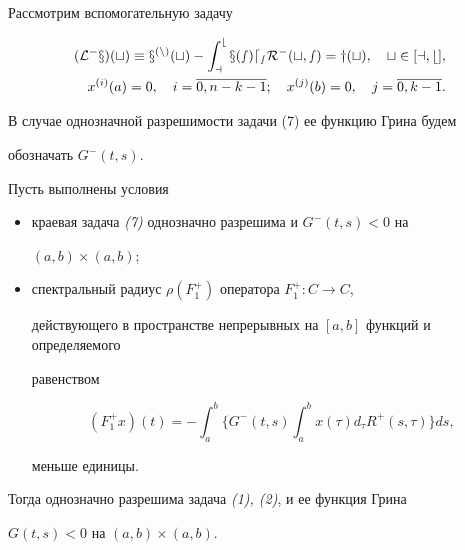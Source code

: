 Рассмотрим вспомогательную задачу 


\begin{equation} 


\begin{split} 


(\cal L^-x)(t)\equiv x^{(n)}(t)-\int^b_a x(s)d_sR^-(t,s)=y(t), 


\quad t\in[a,b],\\ 


x^{(i)}(a)=0,\quad i=\overline{0,n-k-1};\quad 


x^{(j)}(b)=0,\quad j=\overline{0,k-1}. 


\end{split} 


\end{equation} 


В случае однозначной разрешимости задачи (7) ее функцию Грина будем 


обозначать $G^-(t,s)$. 


 


\begin{lem} Пусть выполнены условия 


\begin{itemize} 


\item[1)] краевая задача {\em (7)} однозначно разрешима и $G^-(t,s)<0$ на 


$(a,b)\times(a,b)$; 


\item[2)] спектральный радиус $\rho(F^+_1)$ оператора $F^+_1:C\to C$, 


действующего в пространстве непрерывных на $[a,b]$ функций и определяемого 


равенством 


\begin{equation} 


(F^+_1x)(t)=-\int^b_a\biggl\{G^-(t,s)\int^b_a x(\tau)d_\tau R^+(s,\tau) 


\biggr\}ds, 


\end{equation} 


меньше единицы. 


\end{itemize} 


Тогда однозначно разрешима задача {\em (1), (2)}, и ее функция Грина 


$G(t,s)<0$ на $(a,b)\times(a,b)$. 


\end{lem} 


